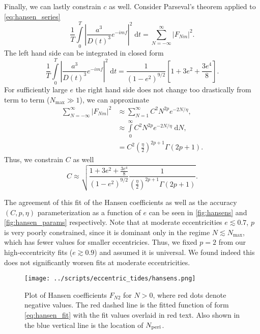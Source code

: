 \documentclass[
        fleqn,
        usenatbib,
        referee,
    ]{mnras}
\newcommand*{\abs}[1]{\left|#1\right|}
\newcommand*{\p}[1]{\left(#1\right)}
\newcommand*{\s}[1]{\left[#1\right]}
\begin{document}
\begin{itemize}
        Finally, we can lastly constrain $c$ as well. Consider Parseval's
        theorem applied to \autoref{eq:hansen_series}
        \begin{equation}
            \frac{1}{T}\int\limits_{0}^T \abs{\frac{a^3}{D(t)^3}e^{-imf}}^2
                    \;\mathrm{d}t =
                \sum\limits_{N = -\infty}^\infty \abs{F_{Nm}}^2
                .\label{eq:parsevals}
        \end{equation}
        The left hand side can be integrated in closed form
        \begin{equation}
            \frac{1}{T}\int\limits_{0}^T \abs{\frac{a^3}{D(t)^3}e^{-imf}}^2
                \;\mathrm{d}t = \frac{1}{\p{1 - e^2}^{9/2}}\s{
                    1 + 3e^2 + \frac{3e^4}{8}}.
        \end{equation}
        For sufficiently large $e$ the right hand side does not change too
        drastically from term to term ($N_{\max} \gg 1$), we can approximate
        \begin{align}
            \sum\limits_{N = -\infty}^\infty \abs{F_{Nm}}^2 &\approx
                    \sum\limits_{N = 1}^\infty C^2 N^{2p} e^{-2N/\eta},\\
                &\approx \int\limits_0^{\infty}
                    C^2N^{2p} e^{-2N/\eta}\;\mathrm{d}N,\\
                &= C^2 \p{\frac{\eta}{2}}^{2p + 1}\Gamma\p{2p + 1}.
        \end{align}
        Thus, we constrain $C$ as well
        \begin{equation}
            C \approx \sqrt{
                \frac{1 + 3e^2 + \frac{3e^4}{8}}{\p{1 - e^2}^{9/2}}
                \frac{1}{\p{\frac{\eta}{2}}^{2p + 1} \Gamma\p{2 p + 1}}}.
                \label{eq:c_approx}
        \end{equation}
\end{itemize}
The agreement of this fit of the Hansen coefficients as well as the accuracy
$\p{C, p, \eta}$ parameterization as a function of $e$ can be seen in
\autoref{fig:hansens} and \autoref{fig:hansen_params} respectively. Note that at
moderate eccentricities $e \lesssim 0.7$, $p$ is very poorly constrained, since
it is dominant only in the regime $N \lesssim N_{\max}$, which has fewer values
for smaller eccentricies. Thus, we fixed $p = 2$ from our high-eccentricity fits
($e \gtrsim 0.9$) and assumed it is universal. We found indeed this does not
significantly worsen fits at moderate eccentricities.
\begin{figure}
    \centering
    \texttt{[image: ../scripts/eccentric\_tides/hansens.png]}
    \caption{Plot of Hansen coefficients $F_{N2}$ for $N > 0$, where red dots
    denote negative values. The red dashed line is the fitted function of form
    \autoref{eq:hansen_fit} with the fit values overlaid in red text. Also shown
    in the blue vertical line is the location of $N_{\rm
    peri}$.}\label{fig:hansens}
\end{figure}
\end{document}
